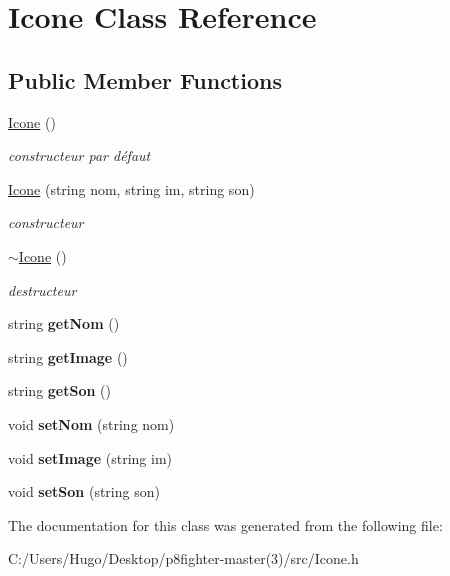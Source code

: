 \hypertarget{class_icone}{}\section{Icone Class Reference}
\label{class_icone}
\subsection*{Public Member Functions}
\begin{DoxyCompactItemize}
\item 
\mbox{\label{class_icone_af440e0e5c6d7b56b7470c3b380f4a28c}} 
\hyperlink{class_icone_af440e0e5c6d7b56b7470c3b380f4a28c}{Icone} ()
\begin{DoxyCompactList}\small\item\em constructeur par défaut \end{DoxyCompactList}\item 
\mbox{\label{class_icone_acb8c966e7f6dc927633ad2b4700e502e}} 
\hyperlink{class_icone_acb8c966e7f6dc927633ad2b4700e502e}{Icone} (string nom, string im, string son)
\begin{DoxyCompactList}\small\item\em constructeur \end{DoxyCompactList}\item 
\mbox{\label{class_icone_a3244dc7e1dc67675c2c999aa212962a3}} 
\hyperlink{class_icone_a3244dc7e1dc67675c2c999aa212962a3}{$\sim$\+Icone} ()
\begin{DoxyCompactList}\small\item\em destructeur \end{DoxyCompactList}\item 
\mbox{\label{class_icone_a067832df0ef7ea6a135ee97f55946a9f}} 
string {\bfseries get\+Nom} ()
\item 
\mbox{\label{class_icone_a3657014c99143d56ea9fa8054acce01e}} 
string {\bfseries get\+Image} ()
\item 
\mbox{\label{class_icone_a47fd0af71310b8b8958d5e6386fde5cb}} 
string {\bfseries get\+Son} ()
\item 
\mbox{\label{class_icone_a03eb26c6d94b40091d1cb47e103c1f48}} 
void {\bfseries set\+Nom} (string nom)
\item 
\mbox{\label{class_icone_ac83f6f6b06048d628b07b6f2806cda2b}} 
void {\bfseries set\+Image} (string im)
\item 
\mbox{\label{class_icone_af785ff0d511fe201bcbc0aa4f6d1b242}} 
void {\bfseries set\+Son} (string son)
\end{DoxyCompactItemize}


The documentation for this class was generated from the following file\+:\begin{DoxyCompactItemize}
\item 
C\+:/\+Users/\+Hugo/\+Desktop/p8fighter-\/master(3)/src/Icone.\+h\end{DoxyCompactItemize}
